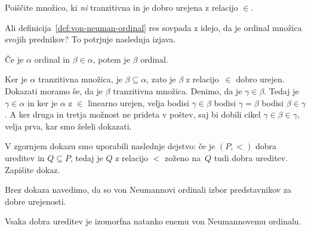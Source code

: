 \begin{vaja}
  Poiščite množico, ki \emph{ni} tranzitivna in je dobro urejena z relacijo $\in$.
\end{vaja}

Ali definicija~\ref{def:von-neuman-ordinal} res sovpada z idejo, da je ordinal množica svojih prednikov? To potrjuje naslednja izjava.

\begin{izjava}
  Če je $\alpha$ ordinal in $\beta \in \alpha$, potem je $\beta$ ordinal.
\end{izjava}

\begin{dokaz}
  Ker je $\alpha$ tranzitivna množica, je $\beta \subseteq \alpha$, zato je $\beta$ z relacijo~$\in$ dobro urejen. Dokazati moramo še, da je $\beta$ tranzitivna množica. Denimo, da je $\gamma \in \beta$.
  Tedaj je $\gamma \in \alpha$ in ker je $\alpha$ z $\in$ linearno urejen, velja bodisi $\gamma \in \beta$ bodisi $\gamma = \beta$ bodisi $\beta \in \gamma$. A ker druga in tretja možnost ne prideta v poštev, saj bi dobili cikel $\gamma \in \beta \in \gamma$, velja prva, kar smo želeli dokazati.
\end{dokaz}

\begin{vaja}
  V zgornjem dokazu smo uporabili naslednje dejstvo: če je $(P, {<})$ dobra ureditev in $Q \subseteq P$, tedaj je $Q$ z relacijo $<$ zoženo na~$Q$ tudi dobra ureditev. Zapišite dokaz.
\end{vaja}

Brez dokaza navedimo, da so von Neumannovi ordinali izbor predstavnikov za dobre urejenosti.

\begin{izrek}
  Vsaka dobra ureditev je izomorfna natanko enemu von Neumannovemu ordinalu.
\end{izrek}

